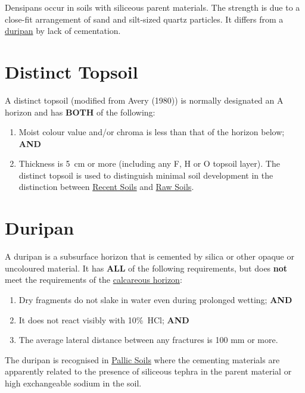 \documentclass[
  letterpaper,
  DIV=11,
  numbers=noendperiod]{scrreprt}
\providecommand{\tightlist}{%
  \setlength{\itemsep}{0pt}\setlength{\parskip}{0pt}}\usepackage{longtable,booktabs,array}
\begin{document}
Densipans occur in soils with siliceous parent materials. The strength
is due to a close-fit arrangement of sand and silt-sized quartz
particles. It differs from a \protect\hyperlink{sec-diag-dpan}{duripan}
by lack of cementation.

\hypertarget{sec-diag-dts}{%
\section{Distinct Topsoil}\label{sec-diag-dts}}

A distinct topsoil (modified from Avery (1980)) is normally designated
an A horizon and has \textbf{BOTH} of the following:

\begin{enumerate}
\def\labelenumi{\arabic{enumi}.}
\tightlist
\item
  Moist colour value and/or chroma is less than that of the horizon
  below; \textbf{AND}
\item
  Thickness is 5~cm or more (including any F, H or O topsoil layer). The
  distinct topsoil is used to distinguish minimal soil development in
  the distinction between \protect\hyperlink{sec-ord-R}{Recent Soils}
  and \protect\hyperlink{sec-ord-W}{Raw Soils}.
\end{enumerate}

\hypertarget{sec-diag-dpan}{%
\section{Duripan}\label{sec-diag-dpan}}

A duripan is a subsurface horizon that is cemented by silica or other
opaque or uncoloured material. It has \textbf{ALL} of the following
requirements, but does \textbf{not} meet the requirements of the
\protect\hyperlink{sec-diag-calch}{calcareous horizon}:

\begin{enumerate}
\def\labelenumi{\arabic{enumi}.}
\tightlist
\item
  Dry fragments do not slake in water even during prolonged wetting;
  \textbf{AND}
\item
  It does not react visibly with 10\%~HCl; \textbf{AND}
\item
  The average lateral distance between any fractures is 100 mm or more.
\end{enumerate}

The duripan is recognised in \protect\hyperlink{sec-ord-P}{Pallic Soils}
where the cementing materials are apparently related to the presence of
siliceous tephra in the parent material or high exchangeable sodium in
the soil.
\end{document}
